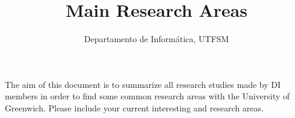 \documentclass[12pt,reqno]{amsart}
\title{Main Research Areas}
\author{Departamento de Inform\'atica, UTFSM}
\begin{document}
\maketitle

The aim of this document is to summarize all research studies made by DI
members in order to find some common research areas with the University of
Greenwich. Please include your current interesting and research areas.










\end{document}
